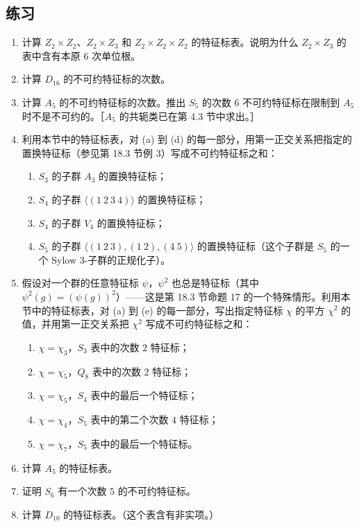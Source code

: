 \subsection*{练习}
\begin{enumerate}[label=\arabic*.]
  \item 计算 $Z_2\times Z_2$、$Z_2\times Z_3$ 和 $Z_2\times Z_2\times Z_2$ 的特征标表。说明为什么 $Z_2\times Z_3$ 的表中含有本原 $6$ 次单位根。
  \item 计算 $D_{16}$ 的不可约特征标的次数。
  \item 计算 $A_5$ 的不可约特征标的次数。推出 $S_5$ 的次数 $6$ 不可约特征标在限制到 $A_5$ 时不是不可约的。［$A_5$ 的共轭类已在第 4.3 节中求出。］
  \item 利用本节中的特征标表，对 (a) 到 (d) 的每一部分，用第一正交关系把指定的置换特征标（参见第 18.3 节例 3）写成不可约特征标之和：
  \begin{enumerate}[label=(\alph*)]
    \item $S_3$ 的子群 $A_3$ 的置换特征标；
    \item $S_4$ 的子群 $\langle(1\ 2\ 3\ 4)\rangle$ 的置换特征标；
    \item $S_4$ 的子群 $V_4$ 的置换特征标；
    \item $S_5$ 的子群 $\langle(1\ 2\ 3),(1\ 2),(4\ 5)\rangle$ 的置换特征标（这个子群是 $S_5$ 的一个 Sylow $3$-子群的正规化子）。
  \end{enumerate}
  \item 假设对一个群的任意特征标 $\psi$，$\psi^2$ 也总是特征标（其中 $\psi^2(g)=(\psi(g))^2$）——这是第 18.3 节命题 17 的一个特殊情形。利用本节中的特征标表，对 (a) 到 (e) 的每一部分，写出指定特征标 $\chi$ 的平方 $\chi^2$ 的值，并用第一正交关系把 $\chi^2$ 写成不可约特征标之和：
  \begin{enumerate}[label=(\alph*)]
    \item $\chi=\chi_3$，$S_3$ 表中的次数 $2$ 特征标；
    \item $\chi=\chi_5$，$Q_8$ 表中的次数 $2$ 特征标；
    \item $\chi=\chi_5$，$S_4$ 表中的最后一个特征标；
    \item $\chi=\chi_4$，$S_5$ 表中的第二个次数 $4$ 特征标；
    \item $\chi=\chi_7$，$S_5$ 表中的最后一个特征标。
  \end{enumerate}
  \item 计算 $A_5$ 的特征标表。
  \item 证明 $S_6$ 有一个次数 $5$ 的不可约特征标。
  \item 计算 $D_{10}$ 的特征标表。（这个表含有非实项。）

\end{enumerate}
